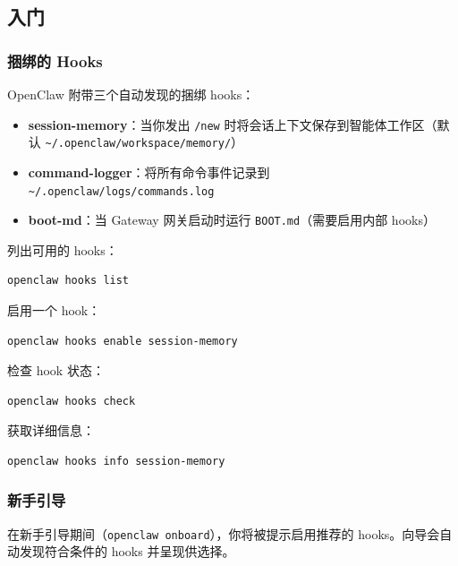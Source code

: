 \subsection{入门}


\subsubsection{捆绑的 Hooks}


OpenClaw 附带三个自动发现的捆绑 hooks：

\begin{itemize}
  \item \textbf{ session-memory}：当你发出 \texttt{/new} 时将会话上下文保存到智能体工作区（默认 \texttt{\textasciitilde{}/.openclaw/workspace/memory/}）
  \item \textbf{ command-logger}：将所有命令事件记录到 \texttt{\textasciitilde{}/.openclaw/logs/commands.log}
  \item \textbf{ boot-md}：当 Gateway 网关启动时运行 \texttt{BOOT.md}（需要启用内部 hooks）
\end{itemize}


列出可用的 hooks：

\begin{lstlisting}[language=bash]
openclaw hooks list
\end{lstlisting}


启用一个 hook：

\begin{lstlisting}[language=bash]
openclaw hooks enable session-memory
\end{lstlisting}


检查 hook 状态：

\begin{lstlisting}[language=bash]
openclaw hooks check
\end{lstlisting}


获取详细信息：

\begin{lstlisting}[language=bash]
openclaw hooks info session-memory
\end{lstlisting}


\subsubsection{新手引导}


在新手引导期间（\texttt{openclaw onboard}），你将被提示启用推荐的 hooks。向导会自动发现符合条件的 hooks 并呈现供选择。

